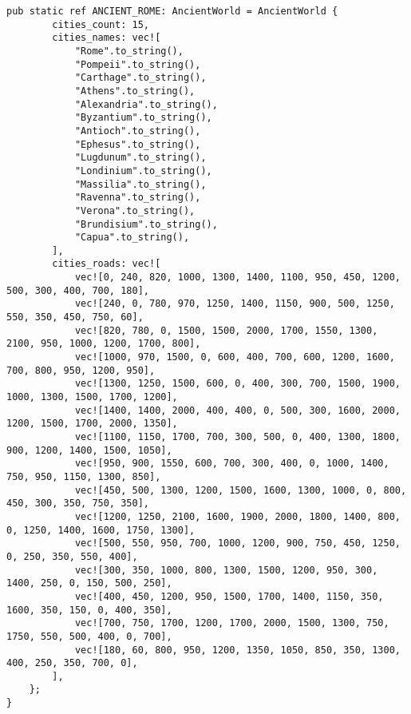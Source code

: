 \begin{center}
\begin{lstlisting}[label=lst:ancient_world_example,caption=примеры стран древнего мира]
    pub static ref ANCIENT_ROME: AncientWorld = AncientWorld {
        cities_count: 15,
        cities_names: vec![
            "Rome".to_string(),
            "Pompeii".to_string(),
            "Carthage".to_string(),
            "Athens".to_string(),
            "Alexandria".to_string(),
            "Byzantium".to_string(),
            "Antioch".to_string(),
            "Ephesus".to_string(),
            "Lugdunum".to_string(),
            "Londinium".to_string(),
            "Massilia".to_string(),
            "Ravenna".to_string(),
            "Verona".to_string(),
            "Brundisium".to_string(),
            "Capua".to_string(),
        ],
        cities_roads: vec![
            vec![0, 240, 820, 1000, 1300, 1400, 1100, 950, 450, 1200, 500, 300, 400, 700, 180], 
            vec![240, 0, 780, 970, 1250, 1400, 1150, 900, 500, 1250, 550, 350, 450, 750, 60],   
            vec![820, 780, 0, 1500, 1500, 2000, 1700, 1550, 1300, 2100, 950, 1000, 1200, 1700, 800], 
            vec![1000, 970, 1500, 0, 600, 400, 700, 600, 1200, 1600, 700, 800, 950, 1200, 950], 
            vec![1300, 1250, 1500, 600, 0, 400, 300, 700, 1500, 1900, 1000, 1300, 1500, 1700, 1200], 
            vec![1400, 1400, 2000, 400, 400, 0, 500, 300, 1600, 2000, 1200, 1500, 1700, 2000, 1350], 
            vec![1100, 1150, 1700, 700, 300, 500, 0, 400, 1300, 1800, 900, 1200, 1400, 1500, 1050], 
            vec![950, 900, 1550, 600, 700, 300, 400, 0, 1000, 1400, 750, 950, 1150, 1300, 850],   
            vec![450, 500, 1300, 1200, 1500, 1600, 1300, 1000, 0, 800, 450, 300, 350, 750, 350],  
            vec![1200, 1250, 2100, 1600, 1900, 2000, 1800, 1400, 800, 0, 1250, 1400, 1600, 1750, 1300], 
            vec![500, 550, 950, 700, 1000, 1200, 900, 750, 450, 1250, 0, 250, 350, 550, 400],     
            vec![300, 350, 1000, 800, 1300, 1500, 1200, 950, 300, 1400, 250, 0, 150, 500, 250],   
            vec![400, 450, 1200, 950, 1500, 1700, 1400, 1150, 350, 1600, 350, 150, 0, 400, 350],  
            vec![700, 750, 1700, 1200, 1700, 2000, 1500, 1300, 750, 1750, 550, 500, 400, 0, 700], 
            vec![180, 60, 800, 950, 1200, 1350, 1050, 850, 350, 1300, 400, 250, 350, 700, 0],     
        ],
    };
}
\end{lstlisting}
\end{center}

